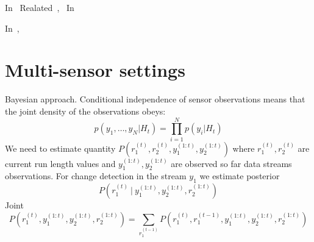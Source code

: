 In~\cite{MiaoMultiSensor}
Realated~\cite{Stankovic_Distrubuted_Chp},~\cite{Ohlsson_Distr_Chp}
In~\cite{AgarwalBayesMultiAnomalies}

In~\cite{DistributedDetectionI},~\cite{DistributedDetectionII} 

\section{Multi-sensor settings}
Bayesian approach.
Conditional independence of sensor observations means that the joint density of the observations obeys:
\begin{equation}
p(y_1, \dots, y_N | H_t) = \prod_{i=1}^N p(y_i | H_t)
\end{equation}
We need to estimate quantity $P(r_1^{(t)}, r_2^{(t)}, y_1^{(1:t)}, y_2^{(1:t)})$ where $r_1^{(t)}, r_2^{(t)}$ are current run length values and $y_1^{(1:t)}, y_2^{(1:t)}$ are observed so far data streams observations.
For change detection in the stream $y_1$ we estimate posterior
\begin{equation}
P(r_1^{(t)} \: | \: y_1^{(1:t)}, y_2^{(1:t)}, r_2^{(1:t)})
\end{equation}
Joint
\begin{equation}
P(r_1^{(t)}, y_1^{(1:t)}, y_2^{(1:t)}, r_2^{(1:t)}) = 
\sum_{r_1^{(t-1)}} P(r_1^{(t)}, r_1^{(t-1)}, y_1^{(1:t)}, y_2^{(1:t)}, r_2^{(1:t)})
\end{equation}
